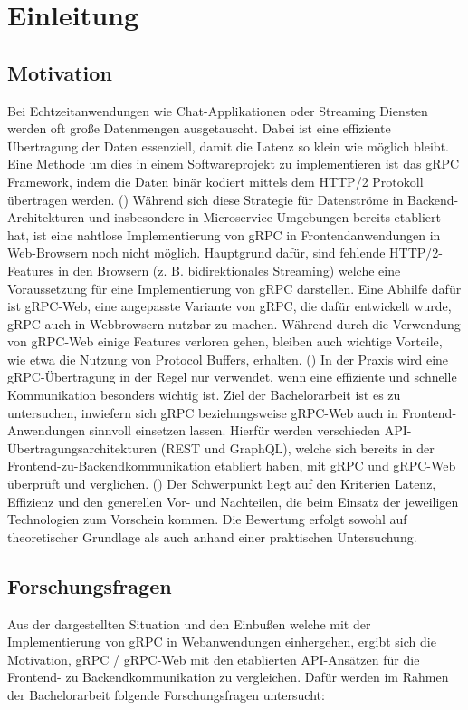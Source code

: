 \chapter{ Einleitung }
\label{chap:info_REMOVE_ME}
\chapterstart

\section{Motivation}
Bei Echtzeitanwendungen wie Chat-Applikationen oder Streaming Diensten werden oft große Datenmengen ausgetauscht. Dabei ist eine effiziente Übertragung der Daten essenziell, damit die Latenz so klein wie möglich bleibt. Eine Methode um dies in einem Softwareprojekt zu implementieren ist das gRPC Framework, indem die Daten binär kodiert mittels dem HTTP/2 Protokoll übertragen werden. (\parencite{gRPCAbout})
Während sich diese Strategie für Datenströme in Backend-Architekturen und insbesondere in Microservice-Umgebungen bereits etabliert hat, ist eine nahtlose Implementierung von gRPC in Frontendanwendungen in Web-Browsern noch nicht möglich. Hauptgrund dafür, sind fehlende HTTP/2-Features in den Browsern (z. B. bidirektionales Streaming) welche eine Voraussetzung für eine Implementierung von gRPC darstellen. Eine Abhilfe dafür ist gRPC-Web, eine angepasste Variante von gRPC, die dafür entwickelt wurde, gRPC auch in Webbrowsern nutzbar zu machen. Während durch die Verwendung von gRPC-Web einige Features verloren gehen, bleiben auch wichtige Vorteile, wie etwa die Nutzung von Protocol Buffers, erhalten. (\parencite{Brandhorst2019}) In der Praxis wird eine gRPC-Übertragung in der Regel nur verwendet, wenn eine effiziente und schnelle Kommunikation besonders wichtig ist. Ziel der Bachelorarbeit ist es zu untersuchen, inwiefern sich gRPC beziehungsweise gRPC-Web auch in Frontend-Anwendungen sinnvoll einsetzen lassen. Hierfür werden verschieden API-Übertragungsarchitekturen (REST und GraphQL), welche sich bereits in der Frontend-zu-Backendkommunikation etabliert haben, mit gRPC und gRPC-Web überprüft und verglichen. (\parencite{Ahmad2025}) Der Schwerpunkt liegt auf den Kriterien Latenz, Effizienz und den generellen Vor- und Nachteilen, die beim Einsatz der jeweiligen Technologien zum Vorschein kommen. Die Bewertung erfolgt sowohl auf theoretischer Grundlage als auch anhand einer praktischen Untersuchung.

\section{Forschungsfragen}
Aus der dargestellten Situation und den Einbußen welche mit der Implementierung von
gRPC in Webanwendungen einhergehen, ergibt sich die Motivation, gRPC /
gRPC-Web mit den etablierten API-Ansätzen für die Frontend- zu Backendkommunikation zu vergleichen. Dafür werden im Rahmen der Bachelorarbeit folgende Forschungsfragen untersucht:

